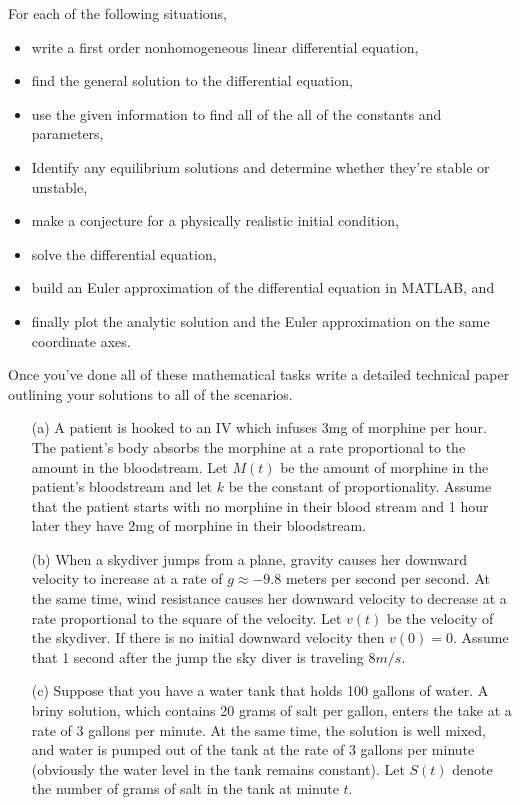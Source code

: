 \begin{problem}
    For each of the following situations, 
    \begin{itemize}
        \item write a first order nonhomogeneous linear differential equation, 
        \item find the general solution to the differential equation, 
        \item use the given information to find all of the all of the constants and
            parameters,
        \item Identify any equilibrium solutions and determine whether they're stable or
            unstable,
        \item make a conjecture for a physically realistic initial condition,
        \item solve the differential equation,
        \item build an Euler approximation of the differential equation in MATLAB, and 
        \item finally plot the analytic solution and the Euler approximation on the same
            coordinate axes.
    \end{itemize}
    Once you've done all of these mathematical tasks write a detailed technical paper
    outlining your solutions to all of the scenarios.
    \begin{enumerate}
        \item[(a)] A patient is hooked to an IV which infuses 3mg of morphine per hour. The
            patient's body absorbs the morphine at a rate proportional to the amount in the bloodstream.
            Let $M(t)$ be the amount of morphine in the patient's bloodstream and let $k$ be
            the constant of proportionality. Assume that the patient starts with no
            morphine in their blood stream and 1 hour later they have 2mg of morphine in
            their bloodstream.
        \item[(b)] When a skydiver jumps from a plane, gravity causes her downward
            velocity to increase at a rate of $g \approx −9.8$ meters per second per second. At
            the same time, wind resistance causes her downward velocity to decrease at a
            rate proportional to the square of the velocity. Let $v(t)$ be the velocity of the skydiver.
            If there is no initial downward velocity then $v(0) = 0$. Assume that 1 second
            after the jump the sky diver is traveling $8m/s$.
        \item[(c)] Suppose that you have a water tank that holds 100 gallons of water. A
            briny solution, which contains 20 grams of salt per gallon, enters the take at
            a rate of 3 gallons per minute. At the same time, the solution is well mixed,
            and water is pumped out of the tank at the rate of 3 gallons per minute
            (obviously the water level in the tank remains constant). Let $S(t)$ denote the
            number of grams of salt in the tank at minute $t$.
    \end{enumerate}
\end{problem}




